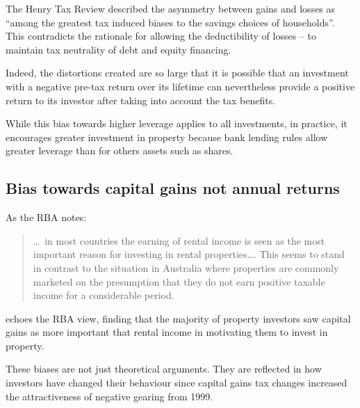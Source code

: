 \documentclass{grattan}\usepackage[]{graphicx}\usepackage[]{color}
\begin{document}
The Henry Tax Review described the asymmetry between gains and losses as ``among the greatest tax induced biases to the savings choices of households''.  This contradicts the rationale for allowing the deductibility of losses -- to maintain tax neutrality of debt and equity financing.

Indeed, the distortions created are so large that it is possible that an investment with a negative pre-tax return over its lifetime can nevertheless provide a positive return to its investor after taking into account the tax benefits.  

While this bias towards higher leverage applies to all investments, in practice, it encourages greater investment in property because bank lending rules allow greater leverage than for others assets such as shares.

\subsection{Bias towards capital gains not annual returns}
As the RBA notes:

\begin{quote}
\dots\ in most countries the earning of rental income is seen as the most important reason for investing in rental properties\dots{}. This seems to stand in contrast to the situation in Australia where properties are commonly marketed on the presumption that they do not earn positive taxable income for a considerable period.
\end{quote}

\textcite{SeeligThompsonBurkeEtAl2009} echoes the RBA view, finding that the majority of property investors saw capital gains as more important that rental income in motivating them to invest in property.


These biases are not just theoretical arguments. They are reflected in how investors have changed their behaviour since capital gains tax changes increased the attractiveness of negative gearing from 1999.
\end{document}
